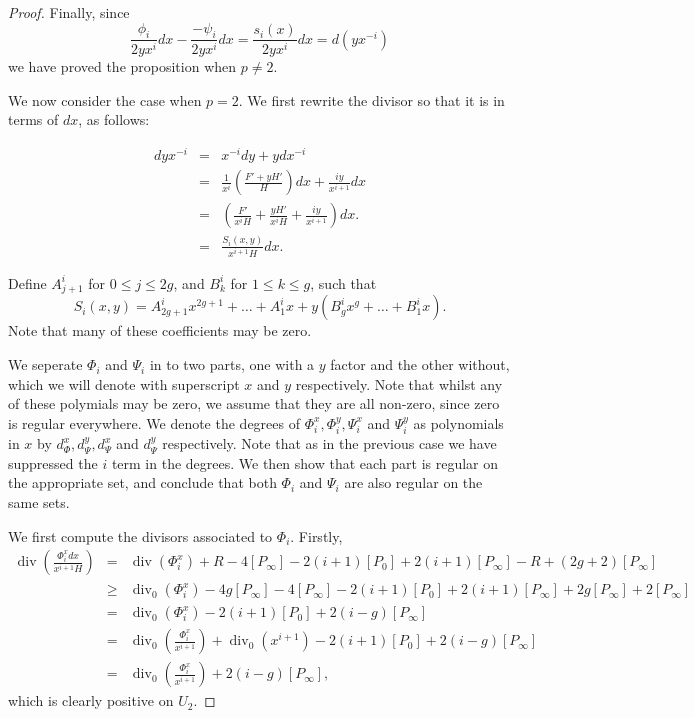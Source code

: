 \documentclass[draft, 11pt]{article} %
\theoremstyle{plain}
\theoremstyle{remark}
\DeclareMathOperator{\di}{div}
\begin{document}
\begin{proof}
Finally, since 
\[ 
\frac{\phi_i}{2yx^i}dx - \frac{-\psi_i}{2yx^i}dx = \frac{s_i(x)}{2yx^i}dx = d(yx^{-i})
\]
we have proved the proposition when $p\neq 2$.

We now consider the case when $p=2$.
We first rewrite the divisor so that it is in terms of $dx$, as follows:

\begin{eqnarray*}
dyx^{-i} & = & x^{-i}dy + ydx^{-i} \\
& = & \frac{1}{x^i} \left( \frac{F' + yH'}{H}\right) dx + \frac{iy}{x^{i+1}}dx \\
& = & \left( \frac{F'}{x^iH} + \frac{yH'}{x^iH} + \frac{iy}{x^{i+1}} \right) dx.\\
& = & \frac{S_i(x,y)}{x^{i+1}H}dx.
\end{eqnarray*}

Define $A^i_{j+1}$ for $0 \leq j \leq 2g$, and $B_k^i$ for $1\leq k \leq g$, such that
\[
	S_i(x,y) = A_{2g+1}^ix^{2g+1} + \ldots + A^i_1 x + y(B_g^i x^g + \ldots + B_1^i x).
\]
Note that many of these coefficients may be zero.

We seperate $\Phi_i$ and $\Psi_i$ in to two parts, one with a $y$ factor and the other without, which we will denote with superscript $x$ and $y$ respectively.
Note that whilst any of these polymials may be zero, we assume that they are all non-zero, since zero is regular everywhere.
We denote the degrees of $\Phi^x_i, \Phi^y_i, \Psi^x_i$ and $\Psi_i^y$ as polynomials in $x$ by $d^x_\Phi, d^y_\Psi, d^x_\Psi$ and $d^y_\Psi$ respectively.
Note that as in the previous case we have suppressed the $i$ term in the degrees.
We then show that each part is regular on the appropriate set, and conclude that both $\Phi_i$ and $\Psi_i$ are also regular on the same sets.

We first compute the divisors associated to $\Phi_i$.
Firstly, 
\begin{eqnarray*}
\di \left( \frac{\Phi_i^x dx}{x^{i+1} H} \right) & = & \di(\Phi_i^x) + R - 4[P_\infty] - 2(i+1)[P_0] + 2(i+1)[P_\infty] - R + (2g+2) [P_\infty] \\
& \geq & \di_0(\Phi_i^x) - 4g[P_\infty] - 4[P_\infty] - 2(i+1)[P_0] + 2(i+1)[P_\infty] + 2g[P_\infty] + 2[P_\infty] \\
& = & \di_0(\Phi_i^x) - 2(i+1)[P_0] + 2(i-g)[P_\infty] \\
& = & \di_0\left( \frac{\Phi_i^x}{x^{i+1}} \right) + \di_0( x^{i+1}) - 2(i+1)[P_0] + 2(i-g)[P_\infty] \\
& = & \di_0 \left( \frac{\Phi_i^x}{x^{i+1}} \right) + 2(i-g)[P_\infty],
\end{eqnarray*}
which is clearly positive on $U_2$.


\end{proof}
\end{document}
